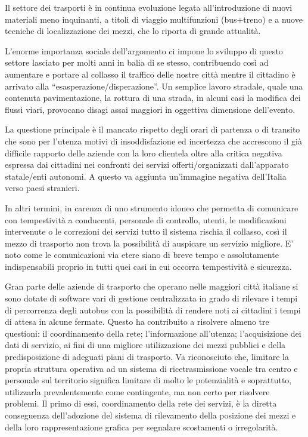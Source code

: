 Il settore dei trasporti è in continua evoluzione legata all'introduzione di nuovi materiali meno inquinanti, a titoli di viaggio multifunzioni (bus+treno) e a nuove tecniche di localizzazione dei mezzi, che lo riporta di grande attualità.

L’enorme importanza sociale dell’argomento ci impone lo sviluppo di questo settore lasciato per molti anni in balia di se stesso, contribuendo così ad aumentare e portare al collasso il traffico delle nostre città mentre il cittadino è arrivato alla “esasperazione/disperazione”.
Un semplice lavoro stradale, quale una contenuta pavimentazione, la rottura di una strada, in alcuni casi la modifica dei flussi viari, provocano disagi assai maggiori in oggettiva dimensione dell'evento.

La questione principale è il mancato rispetto degli orari di partenza o di transito che sono per l'utenza motivi di insoddisfazione ed incertezza che accrescono il già difficile rapporto delle aziende con la loro clientela oltre alla critica negativa espressa dai cittadini nei confronti dei servizi offerti/organizzati dall’apparato statale/enti autonomi. A questo va aggiunta un’immagine negativa dell’Italia verso paesi stranieri.

In altri termini, in carenza di uno strumento idoneo che permetta di comunicare con tempestività a conducenti, personale di controllo, utenti, le modificazioni intervenute o le correzioni dei servizi tutto il sistema rischia il collasso, così il mezzo di trasporto non trova la possibilità di auspicare un servizio migliore. E' noto come le comunicazioni via etere siano di breve tempo e assolutamente indispensabili proprio in tutti quei casi in cui occorra tempestività e sicurezza.

Gran parte delle aziende di trasporto che operano nelle maggiori città italiane si sono dotate di software vari di gestione centralizzata in grado di rilevare i tempi di percorrenza degli autobus con la possibilità di rendere noti ai cittadini i tempi di attesa in alcune fermate. Questo ha contribuito a risolvere almeno tre questioni: il coordinamento della rete; l'informazione all'utenza; l’acquisizione dei dati di servizio, ai fini di una migliore utilizzazione dei mezzi pubblici e della predisposizione di adeguati piani di trasporto.
Va riconosciuto che, limitare la propria struttura operativa ad un sistema di ricetrasmissione vocale tra centro e personale sul territorio significa limitare di molto le potenzialità e soprattutto, utilizzarla prevalentemente come contingente, ma non certo per risolvere problemi.
Il primo di essi, coordinamento della rete dei servizi, è la diretta conseguenza dell’adozione del sistema di rilevamento della posizione dei mezzi e della loro rappresentazione grafica per segnalare scostamenti o irregolarità.

